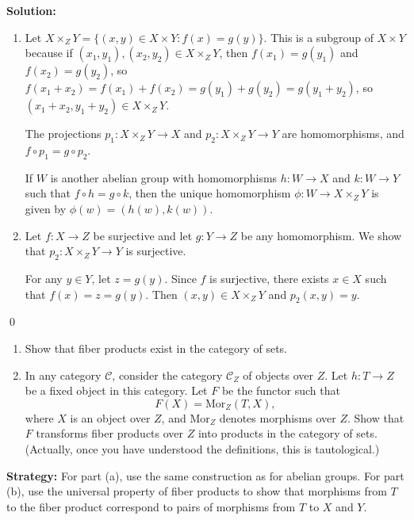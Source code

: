 \noindent\textbf{Solution:}
\begin{enumerate}[label=(\alph*)]
\item Let $X \times_Z Y = \{(x, y) \in X \times Y : f(x) = g(y)\}$. This is a subgroup of $X \times Y$ because if $(x_1, y_1), (x_2, y_2) \in X \times_Z Y$, then $f(x_1) = g(y_1)$ and $f(x_2) = g(y_2)$, so $f(x_1 + x_2) = f(x_1) + f(x_2) = g(y_1) + g(y_2) = g(y_1 + y_2)$, so $(x_1 + x_2, y_1 + y_2) \in X \times_Z Y$.

The projections $p_1: X \times_Z Y \to X$ and $p_2: X \times_Z Y \to Y$ are homomorphisms, and $f \circ p_1 = g \circ p_2$.

If $W$ is another abelian group with homomorphisms $h: W \to X$ and $k: W \to Y$ such that $f \circ h = g \circ k$, then the unique homomorphism $\phi: W \to X \times_Z Y$ is given by $\phi(w) = (h(w), k(w))$.

\item Let $f: X \to Z$ be surjective and let $g: Y \to Z$ be any homomorphism. We show that $p_2: X \times_Z Y \to Y$ is surjective.

For any $y \in Y$, let $z = g(y)$. Since $f$ is surjective, there exists $x \in X$ such that $f(x) = z = g(y)$. Then $(x, y) \in X \times_Z Y$ and $p_2(x, y) = y$.
\end{enumerate}


\qed
\begin{problembox}
\begin{enumerate}[label=(\alph*)]
\item Show that fiber products exist in the category of sets.
\item In any category $\mathcal{C}$, consider the category $\mathcal{C}_Z$ of objects over $Z$. Let $h: T \rightarrow Z$ be a fixed object in this category. Let $F$ be the functor such that
\[F(X) = \text{Mor}_Z(T, X),\]
where $X$ is an object over $Z$, and $\text{Mor}_Z$ denotes morphisms over $Z$. Show that $F$ transforms fiber products over $Z$ into products in the category of sets. (Actually, once you have understood the definitions, this is tautological.)
\end{enumerate}
\end{problembox}

\noindent\textbf{Strategy:} For part (a), use the same construction as for abelian groups. For part (b), use the universal property of fiber products to show that morphisms from $T$ to the fiber product correspond to pairs of morphisms from $T$ to $X$ and $Y$.

